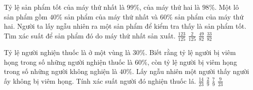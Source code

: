 \begin{ex}%
    Tỷ lệ sản phẩm tốt của máy thứ nhất là $99\%$, của máy thứ hai là $98\%$. Một lô sản phẩm gồm $40\%$ sản phẩm của máy thứ nhất và $60\%$ sản phẩm của máy thứ hai. Người ta lấy ngẫu nhiên ra một sản phẩm để kiểm tra thấy là sản phẩm tốt. Tìm xác suất để sản phẩm đó do máy thứ nhất sản xuất.
    \choice
    {$\frac{123}{125}$}
    {$\frac{2}{125}$}
    {$\frac{49}{82}$}
    {\True $\frac{33}{82}$}
\end{ex}
\begin{ex}%
    Tỷ lệ người nghiện thuốc là ở một vùng là $30\%$. Biết rằng tỷ lệ người bị viêm họng trong số những người nghiện thuốc là $60\%$, còn tỷ lệ người bị viêm họng trong số những người không nghiện là $40\%$. Lấy ngẫu nhiên một người thấy người ấy không bị viêm họng. Tính xác suất người đó nghiện thuốc lá.
    \choice
    {$\frac{14}{23}$}
    {\True $\frac{2}{9}$}
    {$\frac{7}{9}$}
    {$\frac{9}{23}$}
\end{ex}
